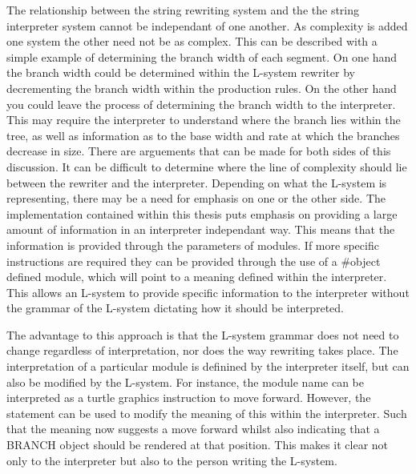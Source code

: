 
The relationship between the string rewriting system and the the string interpreter system cannot be independant of one another. As complexity is added one system the other need not be as complex. This can be described with a simple example of determining the branch width of each segment. On one hand the branch width could be determined within the L-system rewriter by decrementing the branch width within the production rules. On the other hand you could leave the process of determining the branch width to the interpreter. This may require the interpreter to  understand where the branch lies within the tree, as well as information as to the base width and rate at which the branches decrease in size. There are arguements that can be made for both sides of this discussion. It can be difficult to determine where the line of complexity should lie between the rewriter and the interpreter. Depending on what the L-system is representing, there may be a need for emphasis on one or the other side. The implementation contained within this thesis puts emphasis on providing a large amount of information in an interpreter independant way. This means that the information is provided through the parameters of modules. If more specific instructions are required they can be provided through the use of a \#object defined module, which will point to a meaning defined within the interpreter. This allows an L-system to provide specific information to the interpreter without the grammar of the L-system dictating how it should be interpreted.

The advantage to this approach is that the L-system grammar does not need to change regardless of interpretation, nor does the way rewriting takes place. The interpretation of a particular module is definined by the interpreter itself, but can also be modified by the L-system. For instance, the module name  can be interpreted as a turtle graphics instruction to move forward. However, the statement  can be used to modify the meaning of this within the interpreter. Such that the meaning now suggests a move forward whilst also indicating that a BRANCH object should be rendered at that position. This makes it clear not only to the interpreter but also to the person writing the L-system.